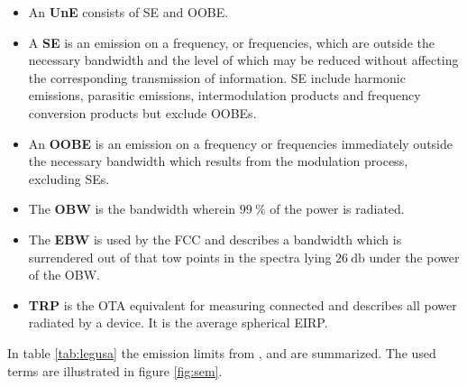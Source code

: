 \begin{itemize}
\item An \textbf{\acf{UnE}} consists of \ac{SE} and \ac{OOBE}.
\item A \textbf{\acf{SE}} is an emission on a frequency, or frequencies, which are outside the necessary bandwidth and the level of which may be reduced without affecting the corresponding transmission of information. \acl{SE} include harmonic
emissions, parasitic emissions, intermodulation products and frequency conversion products but exclude \aclp{OOBE}.
\item An \textbf{\acf{OOBE}} is an emission on a frequency or frequencies immediately outside the necessary bandwidth which results from the modulation process, excluding \aclp{SE}.
\item The \textbf{\acf{OBW}} is the bandwidth wherein $\SI{99}{\percent}$ of the power is radiated.
\item The \textbf{\acf{EBW}} is used by the \ac{FCC} and describes a bandwidth which is surrendered out of that tow points in the spectra lying $\SI{26}{\decibel}$ under the power of the \ac{OBW}. 
\item \textbf{\acf{TRP}} is the \ac{OTA} equivalent for measuring connected and describes all power radiated by a device. It is the average spherical \ac{EIRP}.
\end{itemize}


In table \ref{tab:legusa} the emission limits from \cite{ceptercrec}, \cite{ansi} and \cite{fcc} are summarized. The used terms are illustrated in figure \ref{fig:sem}.

